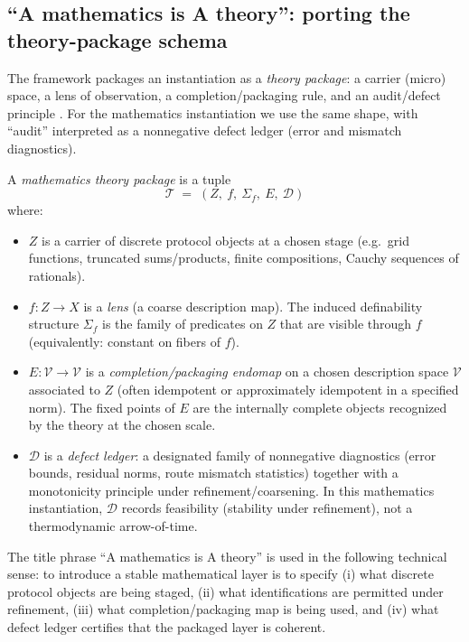 \documentclass[apajournal,article,submit,moreauthors,pdftex]{Definitions/mdpi}
\newenvironment{definition}{\begin{Definition}}{\end{Definition}}
\newenvironment{remark}{\begin{Remark}}{\end{Remark}}
\begin{document}
\subsection{``A mathematics is A theory'': porting the theory-package schema}
The framework packages an instantiation as a \emph{theory package}: a carrier (micro) space, a lens of observation, a completion/packaging rule, and an audit/defect principle \cite{SixBirdsFramework}.
For the mathematics instantiation we use the same shape, with ``audit'' interpreted as a nonnegative defect ledger (error and mismatch diagnostics).

\begin{definition}[Mathematics theory package]\label{def:math-theory-package}
A \emph{mathematics theory package} is a tuple
\[
\mathcal T \;=\; (Z,\ f,\ \Sigma_f,\ E,\ \mathcal D)
\]
where:
\begin{itemize}
  \item $Z$ is a carrier of discrete protocol objects at a chosen stage (e.g.\ grid functions, truncated sums/products, finite compositions, Cauchy sequences of rationals).
  \item $f:Z\to X$ is a \emph{lens} (a coarse description map). The induced definability structure $\Sigma_f$ is the family of predicates on $Z$ that are visible through $f$ (equivalently: constant on fibers of $f$).
  \item $E:\mathcal V\to\mathcal V$ is a \emph{completion/packaging endomap} on a chosen description space $\mathcal V$ associated to $Z$ (often idempotent or approximately idempotent in a specified norm). The fixed points of $E$ are the internally complete objects recognized by the theory at the chosen scale.
  \item $\mathcal D$ is a \emph{defect ledger}: a designated family of nonnegative diagnostics (error bounds, residual norms, route mismatch statistics) together with a monotonicity principle under refinement/coarsening. In this mathematics instantiation, $\mathcal D$ records feasibility (stability under refinement), not a thermodynamic arrow-of-time.
\end{itemize}
\end{definition}

\begin{remark}[Slogan]\label{rem:math-is-theory}
The title phrase ``A mathematics is A theory'' is used in the following technical sense:
to introduce a stable mathematical layer is to specify (i) what discrete protocol objects are being staged, (ii) what identifications are permitted under refinement, (iii) what completion/packaging map is being used, and (iv) what defect ledger certifies that the packaged layer is coherent.
\end{remark}
\end{document}
